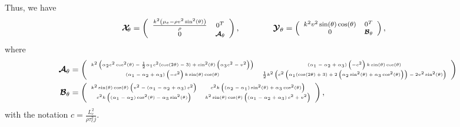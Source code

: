 \documentclass[10pt]{article}
\begin{document}
Thus, we have
\begin{align}
	\boldsymbol{\mathcal{X}}_{\!\! \theta}&=
	\begin{footnotesize}\left(
		\begin{array}{ccc}
			\frac{k^2 \left(\mu _e-\rho  v^2 \sin ^2(\theta )\right)}{\rho } & 0^T \\
			0 &  \boldsymbol{\mathcal{A}}_\theta 
		\end{array}
		\right)\end{footnotesize},\qquad \qquad
	\boldsymbol{\mathcal{Y}}_\theta=
	\begin{footnotesize}\left(
		\begin{array}{ccc}
			k^2 v^2 \sin (\theta ) \cos (\theta ) & 0^T \\
			0 & \boldsymbol{\mathcal{B}}_\theta 
		\end{array}
		\right)\end{footnotesize},
\end{align}
where
\begin{align}
	\boldsymbol{\mathcal{A}}_\theta&=
	\begin{tiny}\left(
		\begin{array}{ccc}
			k^2 \left(\alpha _2 c^2 \cos ^2(\theta )-\frac{1}{2} \alpha _1 c^2 (\cos (2 \theta )-3)+\sin ^2(\theta ) \left(\alpha _3 c^2-v^2\right)\right) & \left(\alpha _1-\alpha _2+\alpha _3\right) \left(-c^2\right) k \sin (\theta ) \cos (\theta ) \\
			\left(\alpha _1-\alpha _2+\alpha _3\right) \left(-c^2\right) k \sin (\theta ) \cos (\theta ) & \frac{1}{2} k^2 \left(c^2 \left(\alpha _1 (\cos (2 \theta )+3)+2 \left(\alpha _2 \sin ^2(\theta )+\alpha _3 \cos ^2(\theta )\right)\right)-2 v^2 \sin ^2(\theta )\right) \\
		\end{array}
		\right)\end{tiny}\\
	\boldsymbol{\mathcal{B}}_\theta&=
	\begin{tiny}\left(
		\begin{array}{ccc}
			k^2 \sin (\theta ) \cos (\theta ) \left(v^2-\left(\alpha _1-\alpha _2+\alpha _3\right) c^2\right) & c^2 k \left(\left(\alpha _2-\alpha _1\right) \sin ^2(\theta )+\alpha _3 \cos ^2(\theta )\right) \\
			c^2 k \left(\left(\alpha _1-\alpha _2\right) \cos ^2(\theta )-\alpha _3 \sin ^2(\theta )\right) & k^2 \sin (\theta ) \cos (\theta ) \left(\left(\alpha _1-\alpha _2+\alpha _3\right) c^2+v^2\right) \\
		\end{array}
		\right)\end{tiny},\notag
\end{align}
with the notation $c=\frac{ L_c^2}{\rho  \tau _c^2 j}$.
\end{document}

